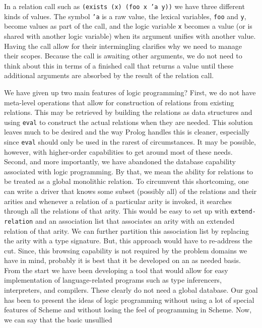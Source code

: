 In a relation call such as \texttt{(exists (x) (foo x 'a y))} we have
three different kinds of values.  The symbol \texttt{'a} is a raw
value, the lexical variables, \texttt{foo} and \texttt{y}, become
values as part of the call, and the logic variable \texttt{x} becomes
a value (or is shared with another logic variable) when its argument
unifies with another value.  Having the call allow for their
intermingling clarifies why we need to manage their scopes.  Because
the call is awaiting other arguments, we do not need to think about
this in terms of a finished call that returns a value until these
additional arguments are absorbed by the result of the relation call.

We have given up two main features of logic programming?  First, we do
not have meta-level operations that allow for construction of relations
from existing relations.  This may be retrieved by building the relations
as data structures and using \texttt{eval} to construct the actual
relations when they are needed.  This solution leaves much to be
desired and the way Prolog handles this is cleaner, especially since
\texttt{eval} should only be used in the rarest of circumstances.  It
may be possible, however, with higher-order capabilities to get
around most of these needs.  Second, and more importantly, we have
abandoned the database capability associated with logic
programming. By that, we mean the ability for relations to be
treated as a global monolithic relation.  To circumvent this
shortcoming, one can write a driver that knows some subset (possibly
all) of the relations and their arities and whenever a relation of a
particular arity is invoked, it searches through all the relations of
that arity.  This would be easy to set up with
\texttt{extend-relation} and an association list that associates an
arity with an extended relation of that arity. We can further
partition this association list by replacing the arity with a type
signature.  But, this approach would have to re-address the cut.
Since, this browsing capability is not required by the problem domains
we have in mind, probably it is best that it be developed on an as
needed basis.  From the start we have been developing a tool that
would allow for easy implementation of language-related programs such
as type inferencers, interpreters, and compilers.  These clearly do
not need a global database.
\newpage
Our goal has been to present the ideas of logic programming without
using a lot of special features of Scheme and without losing the feel
of programming in Scheme.  Now, we can say that the basic unsullied
